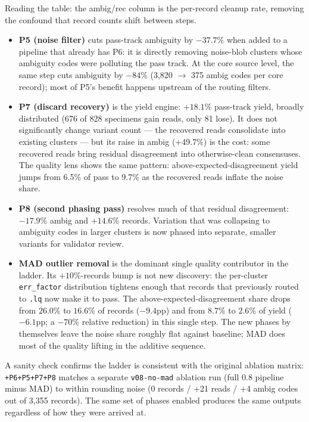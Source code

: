 \documentclass[11pt]{article}
\begin{document}
Reading the table: the ambig/rec column is the per-record cleanup
rate, removing the confound that record counts shift between steps.

\begin{itemize}
\item \textbf{P5 (noise filter)} cuts pass-track ambiguity by $-37.7\%$
when added to a pipeline that already has P6: it is directly removing
noise-blob clusters whose ambiguity codes were polluting the pass track.
At the core source level, the same step cuts ambiguity by $-84\%$ (3,820
$\to$ 375 ambig codes per core record); most of P5's benefit happens
upstream of the routing filters.

\item \textbf{P7 (discard recovery)} is the yield engine: $+18.1\%$
pass-track yield, broadly distributed (676 of 828 specimens gain reads,
only 81 lose). It does not significantly change variant count --- the
recovered reads consolidate into existing clusters --- but its raise in
ambig (+49.7\%) is the cost: some recovered reads bring residual
disagreement into otherwise-clean consensuses. The quality lens shows
the same pattern: above-expected-disagreement yield jumps from 6.5\%
of pass to 9.7\% as the recovered reads inflate the noise share.

\item \textbf{P8 (second phasing pass)} resolves much of that residual
disagreement: $-17.9\%$ ambig and $+14.6\%$ records. Variation that was
collapsing to ambiguity codes in larger clusters is now phased into
separate, smaller variants for validator review.

\item \textbf{MAD outlier removal} is the dominant single quality
contributor in the ladder. Its $+10\%$-records bump is not new
discovery: the per-cluster \texttt{err\_factor} distribution tightens
enough that records that previously routed to \texttt{.lq} now make it
to pass. The above-expected-disagreement share drops from $26.0\%$ to
$16.6\%$ of records ($-9.4$pp) and from $8.7\%$ to $2.6\%$ of yield
($-6.1$pp; a $-70\%$ relative reduction) in this single step. The new
phases by themselves leave the noise share roughly flat against
baseline; MAD does most of the quality lifting in the additive
sequence.
\end{itemize}

A sanity check confirms the ladder is consistent with the original
ablation matrix: \texttt{+P6+P5+P7+P8} matches a separate \texttt{v08-no-mad}
ablation run (full 0.8 pipeline minus MAD) to within rounding noise (0
records / +21 reads / +4 ambig codes out of 3,355 records). The same set
of phases enabled produces the same outputs regardless of how they were
arrived at.
\end{document}
